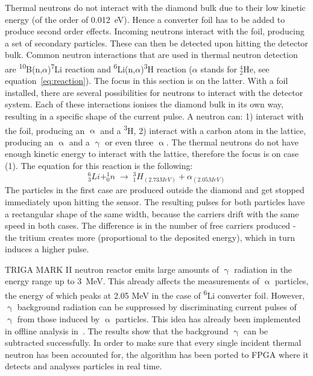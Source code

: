 Thermal neutrons do not interact with the diamond bulk due to their low kinetic energy (of the order of 0.012~eV). Hence a converter foil has to be added to produce second order effects. Incoming neutrons interact with the foil, producing a set of secondary particles. These can then be detected upon hitting the detector bulk. Common neutron interactions that are used in thermal neutron detection are \textsuperscript{10}B(n,$\alpha$)\textsuperscript{7}Li reaction and \textsuperscript{6}Li(n,$\alpha$)\textsuperscript{3}H reaction ($\alpha$ stands for $^4_2$He, see equation~\ref{eq:reaction}). The focus in this section is on the latter. With a foil installed, there are several possibilities for neutrons to interact with the detector system. Each of these interactions ionises the diamond bulk in its own way, resulting in a specific shape of the current pulse. A neutron can: 1) interact with the foil, producing an $\upalpha$ and a \textsuperscript{3}H, 2) interact with a carbon atom in the lattice, producing an $\upalpha$ and a $\upgamma$ or even three $\upalpha$. The thermal neutrons do not have enough kinetic energy to interact with the lattice, therefore the focus is on case (1). The equation for this reaction is the following:
\begin{equation}
\label{eq:reaction}
   ^6_3Li   +   ^1_0n \;\rightarrow\; ^3_1H_{(2.73 MeV)} + \alpha_{(2.05 MeV)}
\end{equation}
The particles in the first case are produced outside the diamond and get stopped immediately upon hitting the sensor. The resulting pulses for both particles have a rectangular shape of the same width, because the carriers drift with the same speed in both cases. The difference is in the number of free carriers produced - the tritium creates more (proportional to the deposited energy), which in turn induces a higher pulse.

TRIGA MARK II neutron reactor emits large amounts of $\upgamma$ radiation in the energy range up to 3~MeV. This already affects the measurements of $\upalpha$ particles, the energy of which peaks at 2.05 MeV in the case of \textsuperscript{6}Li converter foil. However, $\upgamma$ background radiation can be suppressed by discriminating current pulses of $\upgamma$ from those induced by $\upalpha$ particles. This idea has already been implemented in offline analysis in~\cite{PAVEL:00000,PAVEL:00002}. The results show that the background $\upgamma$ can be subtracted successfully. In order to make sure that every single incident thermal neutron has been accounted for, the algorithm has been ported to FPGA where it detects and analyses particles in real time. 

